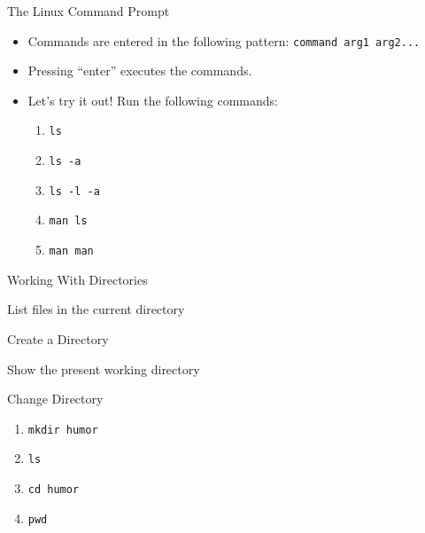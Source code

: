 \documentclass{beamer}
\begin{document}
\begin{frame}{The Linux Command Prompt}

    \begin{itemize}[<+->]
        \item Commands are entered in the following pattern:
            {\tt command arg1 arg2...}
        \item Pressing ``enter'' executes the commands.
        \item Let's try it out!  Run the following commands:
            \begin{enumerate}
                \item {\tt ls}
                \item {\tt ls -a}
                \item {\tt ls -l -a}
                \item {\tt man ls}
                \item {\tt man man}
            \end{enumerate}
    \end{itemize}
\end{frame}

\begin{frame}{Working With Directories}
\begin{description}[<+->]
    \item[{\tt ls}] List files in the current directory
    \item[{\tt mkdir} {\em name}] Create a Directory
    \item[{\tt pwd}] Show the present working directory
    \item[{\tt cd} {\em directory}] Change Directory
\end{description}

\begin{enumerate}[<+->]
    \item {\tt mkdir humor}
    \item {\tt ls}
    \item {\tt cd humor}
    \item {\tt pwd}
\end{enumerate}
\end{frame}
\end{document}
